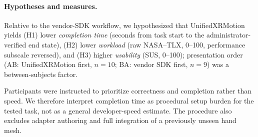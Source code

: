 \documentclass[runningheads]{llncs}
\begin{document}
\paragraph{Hypotheses and measures.}
	Relative to the vendor-SDK workflow, we hypothesized that UnifiedXRMotion yields (H1) lower \emph{completion time} (seconds from task start to the administrator-verified end state), (H2) lower \emph{workload} (raw NASA--TLX, 0--100, performance subscale reversed), and (H3) higher \emph{usability} (SUS, 0--100); presentation order (AB: UnifiedXRMotion first, $n=10$; BA: vendor SDK first, $n=9$) was a between-subjects factor.

Participants were instructed to prioritize correctness and completion rather than speed. We therefore interpret completion time as procedural setup burden for the tested task, not as a general developer-speed estimate. The procedure also excludes adapter authoring and full integration of a previously unseen hand mesh.
\end{document}
